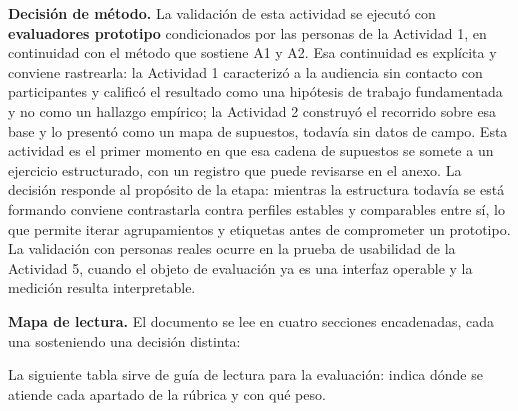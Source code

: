 \textbf{Decisión de método.} La validación de esta actividad se ejecutó con \textbf{evaluadores prototipo} condicionados por las personas de la Actividad 1, en continuidad con el método que sostiene A1 y A2. Esa continuidad es explícita y conviene rastrearla: la Actividad 1 caracterizó a la audiencia sin contacto con participantes y calificó el resultado como una hipótesis de trabajo fundamentada y no como un hallazgo empírico; la Actividad 2 construyó el recorrido sobre esa base y lo presentó como un mapa de supuestos, todavía sin datos de campo. Esta actividad es el primer momento en que esa cadena de supuestos se somete a un ejercicio estructurado, con un registro que puede revisarse en el anexo. La decisión responde al propósito de la etapa: mientras la estructura todavía se está formando conviene contrastarla contra perfiles estables y comparables entre sí, lo que permite iterar agrupamientos y etiquetas antes de comprometer un prototipo. La validación con personas reales ocurre en la prueba de usabilidad de la Actividad 5, cuando el objeto de evaluación ya es una interfaz operable y la medición resulta interpretable.

\textbf{Mapa de lectura.} El documento se lee en cuatro secciones encadenadas, cada una sosteniendo una decisión distinta:

\begin{uxlist}
\end{uxlist}

La siguiente tabla sirve de guía de lectura para la evaluación: indica dónde se atiende cada apartado de la rúbrica y con qué peso.

